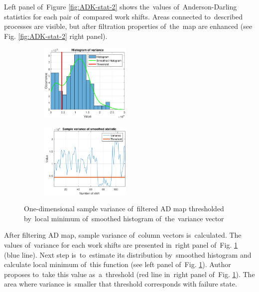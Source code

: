 Left panel of~Figure \ref{fig:ADK-stat-2} shows the~values of~Anderson-Darling statistics for each pair of~compared work shifts. Areas connected to~described processes are visible, but after filtration properties of~the~map are enhanced (see Fig. \ref{fig:ADK-stat-2} right panel).

\begin{figure}[!ht]
 \centering
 \begin{subfigure}
   \centering
   \includegraphics[width=0.48\textwidth]{wykresy/ksd}
 \end{subfigure}
 \begin{subfigure}
   \centering
		\includegraphics[width=0.48\textwidth]{wykresy/ADK-thr}
 \end{subfigure}
 \caption{One-dimensional sample variance of~filtered AD map thresholded by~local minimum of~smoothed histogram of~the~variance vector}
 \label{fig:ADK-KS-thr}
\end{figure}

After filtering AD map, sample variance of~column vectors is~calculated. The values of~variance for each work shifts are presented in~right panel of~Fig. \ref{fig:ADK-KS-thr} (blue line). Next step is~to~estimate its distribution by~smoothed histogram and calculate local minimum of~this function (see left panel of~Fig. \ref{fig:ADK-KS-thr}). Author proposes to~take this value as~a~threshold (red line in~right panel of~Fig. \ref{fig:ADK-KS-thr}). The area where variance is~smaller that threshold corresponds with failure state.

